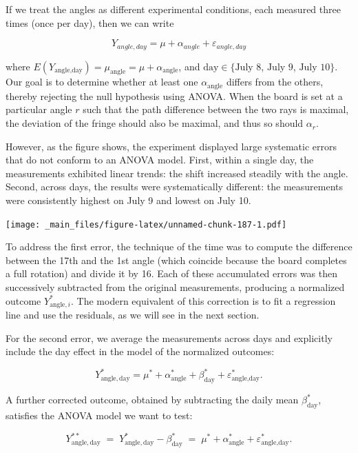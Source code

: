 \documentclass[
]{book}
\begin{document}
If we treat the angles as different experimental conditions, each measured three times (once per day), then we can write

\[Y_{angle, day} = \mu + \alpha_{angle} +\varepsilon_{angle,day}\]

where \(E(Y_{\text{angle}, \text{day}})=\mu_{\text{angle}}=\mu + \alpha_{\text{angle}}\), and \(\text{day}\in\{\text{July 8}\), \(\text{July 9}\), \(\text{July 10}\}\). Our goal is to determine whether at least one \(\alpha_{\text{angle}}\) differs from the others, thereby rejecting the null hypothesis using ANOVA. When the board is set at a particular angle \(r\) such that the path difference between the two rays is maximal, the deviation of the fringe should also be maximal, and thus so should \(\alpha_r\).

However, as the figure shows, the experiment displayed large systematic errors that do not conform to an ANOVA model. First, within a single day, the measurements exhibited linear trends: the shift increased steadily with the angle. Second, across days, the results were systematically different: the measurements were consistently highest on July 9 and lowest on July 10.

\texttt{[image: \_main\_files/figure-latex/unnamed-chunk-187-1.pdf]}

To address the first error, the technique of the time was to compute the difference between the 17th and the 1st angle (which coincide because the board completes a full rotation) and divide it by 16. Each of these accumulated errors was then successively subtracted from the original measurements, producing a normalized outcome \(Y^*_{\text{angle}, i}\). The modern equivalent of this correction is to fit a regression line and use the residuals, as we will see in the next section.

For the second error, we average the measurements across days and explicitly include the day effect in the model of the normalized outcomes:

\[
Y^*_{\text{angle}, \,\text{day}} = \mu^* + \alpha^*_{\text{angle}} + \beta^*_{\text{day}} + \varepsilon^*_{\text{angle},\text{day}} .
\]

A further corrected outcome, obtained by subtracting the daily mean \(\beta^*_{\text{day}}\), satisfies the ANOVA model we want to test:

\[
Y^{**}_{\text{angle}, \,\text{day}} \;=\; Y^{*}_{\text{angle}, \,\text{day}} - \beta^*_{\text{day}} \;=\; \mu^* + \alpha^*_{\text{angle}} + \varepsilon^*_{\text{angle},\text{day}} .
\]
\end{document}
